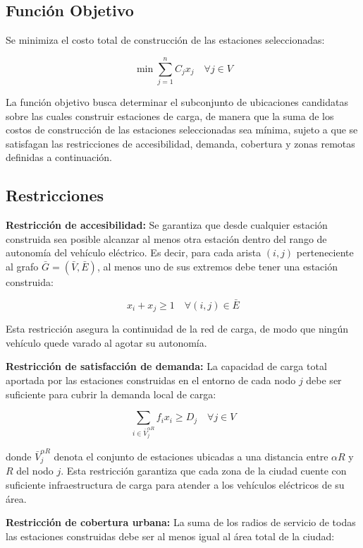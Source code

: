 \documentclass[letter, 10pt]{article}
\begin{document}
\subsection{Función Objetivo}

Se minimiza el costo total de construcción de las estaciones seleccionadas:

\[
\min \sum_{j=1}^{n} C_j x_j \quad \forall j \in V \tag{1}
\]

La función objetivo busca determinar el subconjunto de ubicaciones candidatas sobre las 
cuales construir estaciones de carga, de manera que la suma de los costos de construcción 
de las estaciones seleccionadas sea mínima, sujeto a que se satisfagan las restricciones 
de accesibilidad, demanda, cobertura y zonas remotas definidas a continuación.

\subsection{Restricciones}

\textbf{Restricción de accesibilidad:} Se garantiza que desde cualquier estación construida 
sea posible alcanzar al menos otra estación dentro del rango de autonomía del vehículo 
eléctrico. Es decir, para cada arista $(i,j)$ perteneciente al grafo $\bar{G} = (\bar{V}, \bar{E})$, 
al menos uno de sus extremos debe tener una estación construida:

\[
x_i + x_j \geq 1 \quad \forall (i,j) \in \bar{E} \tag{2}
\]

Esta restricción asegura la continuidad de la red de carga, de modo que ningún vehículo 
quede varado al agotar su autonomía.

\textbf{Restricción de satisfacción de demanda:} La capacidad de carga total aportada por 
las estaciones construidas en el entorno de cada nodo $j$ debe ser suficiente para cubrir 
la demanda local de carga:

\[
\sum_{i \in \bar{V}_j^{\alpha R}} f_i x_i \geq D_j \quad \forall j \in V \tag{3}
\]

donde $\bar{V}_j^{\alpha R}$ denota el conjunto de estaciones ubicadas a una distancia 
entre $\alpha R$ y $R$ del nodo $j$. Esta restricción garantiza que cada zona de la ciudad 
cuente con suficiente infraestructura de carga para atender a los vehículos eléctricos 
de su área.

\textbf{Restricción de cobertura urbana:} La suma de los radios de servicio de todas las 
estaciones construidas debe ser al menos igual al área total de la ciudad:
\end{document}
